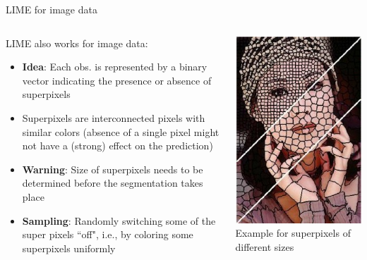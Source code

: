 \documentclass[10pt,compress,t,notes=noshow, xcolor=table]{beamer}
\begin{document}
\begin{frame}{LIME for image data}
	\begin{columns}[totalwidth=\textwidth]
		\begin{column}{0.67\textwidth}
			LIME also works for image data:  
			\begin{itemize}
				\item \textbf{Idea}: Each obs. is represented by a binary vector indicating the presence or absence of superpixels 
				\item Superpixels are interconnected pixels with similar colors (absence of a single pixel might not have a (strong) effect on the prediction)
				\item \textbf{Warning}: Size of superpixels needs to be determined before the segmentation takes place
				\item \textbf{Sampling}: Randomly switching some of the super pixels ``off", i.e., by coloring some superpixels uniformly
			\end{itemize}		
		\end{column}
		\begin{column}{0.26\textwidth}  
			\begin{center}
				\includegraphics[width=1\textwidth]{figure/superpixel_woman}
				{Example for superpixels of different sizes}
			\end{center}
		\end{column}
	\end{columns}
    

\end{frame}
\end{document}
